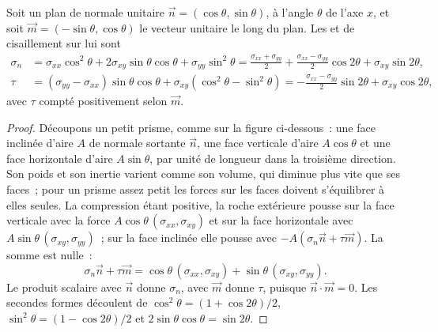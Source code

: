 \begin{proposition}\label{prop:b1:stress-strain-rheology:transformation}
Soit un plan de normale unitaire $\vec n = (\cos\theta, \sin\theta)$, à
l'angle $\theta$ de l'axe $x$, et soit $\vec m = (-\sin\theta, \cos\theta)$
le vecteur unitaire le long du plan. Les  et de cisaillement sur lui sont
\begin{align*}
  \sigma_n &= \sigma_{xx}\cos^2\theta + 2\sigma_{xy}\sin\theta\cos\theta + \sigma_{yy}\sin^2\theta
           = \frac{\sigma_{xx}+\sigma_{yy}}{2} + \frac{\sigma_{xx}-\sigma_{yy}}{2}\cos2\theta + \sigma_{xy}\sin2\theta, \\
  \tau     &= (\sigma_{yy}-\sigma_{xx})\sin\theta\cos\theta + \sigma_{xy}(\cos^2\theta - \sin^2\theta)
           = -\frac{\sigma_{xx}-\sigma_{yy}}{2}\sin2\theta + \sigma_{xy}\cos2\theta ,
\end{align*}
avec $\tau$ compté positivement selon $\vec m$.
\end{proposition}

\begin{proof}
Découpons un petit prisme, comme sur la figure ci-dessous~: une
face inclinée d'aire $A$ de normale sortante $\vec n$, une face verticale
d'aire $A\cos\theta$ et une face horizontale d'aire $A\sin\theta$, par unité de
longueur dans la troisième direction. Son poids et son inertie varient comme son volume,
qui diminue plus vite que ses faces~; pour un prisme assez petit les forces sur
les faces doivent s'équilibrer à elles seules. La compression étant positive, la roche
extérieure pousse sur la face verticale avec la force
$A\cos\theta\,(\sigma_{xx}, \sigma_{xy})$ et sur la face horizontale avec
$A\sin\theta\,(\sigma_{xy}, \sigma_{yy})$~; sur la face inclinée elle pousse
avec $-A(\sigma_n\vec n + \tau\vec m)$. La somme est nulle~:
\[
  \sigma_n\vec n + \tau\vec m = \cos\theta\,(\sigma_{xx}, \sigma_{xy}) + \sin\theta\,(\sigma_{xy}, \sigma_{yy}) .
\]
Le produit scalaire avec $\vec n$ donne $\sigma_n$, avec $\vec m$ donne $\tau$,
puisque $\vec n\cdot\vec m = 0$. Les secondes formes découlent de
$\cos^2\theta = (1+\cos2\theta)/2$, $\sin^2\theta = (1-\cos2\theta)/2$ et
$2\sin\theta\cos\theta = \sin2\theta$.
\end{proof}

